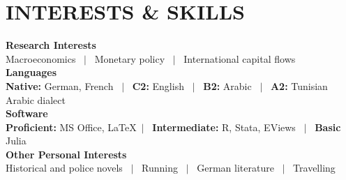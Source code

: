 \documentclass[a4paper,9pt]{extarticle}
\begin{document}

\section*{INTERESTS \& SKILLS}

\noindent
\newline
\textbf{Research Interests} \\
Macroeconomics \ $|$ \ Monetary policy \ $|$ \ International capital flows \\

\noindent
\textbf{Languages} \\
\textbf{Native:} German, French \ $|$ \ \textbf{C2:} English \ $|$ \ \textbf{B2:} Arabic \ $|$ \ \textbf{A2:} Tunisian Arabic dialect \\

\noindent
\textbf{Software} \\
\textbf{Proficient:} MS Office, \LaTeX \ $|$ \ \textbf{Intermediate:} R, Stata, EViews \ $|$ \ \textbf{Basic} Julia  \\

\noindent
\textbf{Other Personal Interests} \\
Historical and police novels \ $|$ \ Running \ $|$ \ German literature \ $|$ \ Travelling  \\


\end{document}
